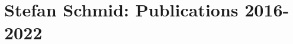\documentclass[8pt]{article}
\begin{document}

\section*{Stefan Schmid: Publications 2016-2022}
\end{document}
